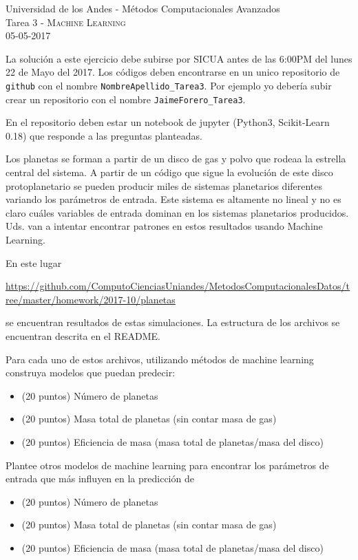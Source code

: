 \documentclass[11pt,letterpaper]{exam}
\begin{document}
\begin{center}
{\Large Universidad de los Andes - M\'etodos Computacionales Avanzados} \\
Tarea 3 - \textsc{Machine Learning}\\
05-05-2017\\
\end{center}

\vspace{0.3cm}


\noindent
La soluci\'on a este ejercicio debe subirse por SICUA antes de las 6:00PM
del lunes 22 de Mayo del 2017. 
Los c\'odigos deben encontrarse en un unico repositorio de \verb'github'
con el nombre \verb"NombreApellido_Tarea3". Por ejemplo yo deber\'ia
subir crear un repositorio con el nombre \verb"JaimeForero_Tarea3". 

\noindent
En el repositorio deben estar un notebook de jupyter (Python3,
Scikit-Learn 0.18) que responde a las preguntas planteadas.
\vspace{0.3cm}

\begin{questions}

Los planetas se forman a partir de un disco de gas y polvo que rodeaa
la estrella central del sistema. A partir de un c\'odigo que sigue la
evoluci\'on de este disco protoplanetario se pueden producir miles de
sistemas planetarios diferentes variando los par\'ametros de
entrada. Este sistema es altamente no lineal y no es claro cu\'ales
variables de entrada dominan en los sistemas planetarios producidos.
Uds. van a intentar encontrar patrones en estos resultados usando
Machine Learning.

En este lugar

\url{https://github.com/ComputoCienciasUniandes/MetodosComputacionalesDatos/tree/master/homework/2017-10/planetas}

se encuentran resultados de estas simulaciones. La estructura de los
archivos se encuentran descrita en el README.

Para cada uno de estos archivos, utilizando m\'etodos de machine
learning construya modelos que puedan predecir:

\begin{itemize}
\item (20 puntos) N\'umero de planetas
\item (20 puntos) Masa total de planetas (sin contar masa de gas)
\item (20 puntos) Eficiencia de masa (masa total de planetas/masa del disco)
\end{itemize}

Plantee otros modelos de machine learning para encontrar los
  par\'ametros de entrada que m\'as influyen en la predicci\'on de 
\begin{itemize}
\item (20 puntos) N\'umero de planetas
\item (20 puntos) Masa total de planetas (sin contar masa de gas)
\item (20 puntos) Eficiencia de masa (masa total de planetas/masa del
  disco)
\end{itemize}
\end{questions}
\end{document}
